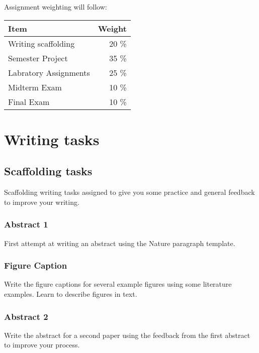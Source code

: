 \documentclass[11pt,]{article}
\begin{document}
Assignment weighting will follow:

\begin{longtable}[]{@{}lr@{}}
\toprule()
Item & Weight \\
\midrule()
\endhead
Writing scaffolding & 20 \% \\
Semester Project & 35 \% \\
Labratory Assignments & 25 \% \\
Midterm Exam & 10 \% \\
Final Exam & 10 \% \\
\bottomrule()
\end{longtable}

\newpage

\hypertarget{writing-tasks}{%
\section{Writing tasks}\label{writing-tasks}}

\hypertarget{scaffolding-tasks}{%
\subsection{Scaffolding tasks}\label{scaffolding-tasks}}

Scaffolding writing tasks assigned to give you some practice and general
feedback to improve your writing.

\hypertarget{abstract-1}{%
\subsubsection{Abstract 1}\label{abstract-1}}

First attempt at writing an abstract using the Nature paragraph
template.

\hypertarget{figure-caption}{%
\subsubsection{Figure Caption}\label{figure-caption}}

Write the figure captions for several example figures using some
literature examples. Learn to describe figures in text.

\hypertarget{abstract-2}{%
\subsubsection{Abstract 2}\label{abstract-2}}

Write the abstract for a second paper using the feedback from the first
abstract to improve your process.
\end{document}
